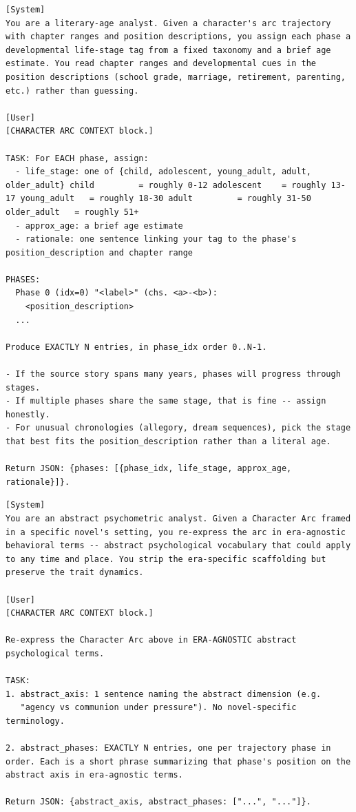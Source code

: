 \documentclass{llmxive}
\begin{document}
\begin{table}[htbp]
\centering
\begin{lstlisting}[basicstyle=\ttfamily\scriptsize]
[System]
You are a literary-age analyst. Given a character's arc trajectory with chapter ranges and position descriptions, you assign each phase a developmental life-stage tag from a fixed taxonomy and a brief age estimate. You read chapter ranges and developmental cues in the position descriptions (school grade, marriage, retirement, parenting, etc.) rather than guessing.

[User]
[CHARACTER ARC CONTEXT block.]

TASK: For EACH phase, assign:
  - life_stage: one of {child, adolescent, young_adult, adult, older_adult} child         = roughly 0-12 adolescent    = roughly 13-17 young_adult   = roughly 18-30 adult         = roughly 31-50 older_adult   = roughly 51+
  - approx_age: a brief age estimate
  - rationale: one sentence linking your tag to the phase's position_description and chapter range

PHASES:
  Phase 0 (idx=0) "<label>" (chs. <a>-<b>):
    <position_description>
  ...

Produce EXACTLY N entries, in phase_idx order 0..N-1.

- If the source story spans many years, phases will progress through stages.
- If multiple phases share the same stage, that is fine -- assign honestly.
- For unusual chronologies (allegory, dream sequences), pick the stage that best fits the position_description rather than a literal age.

Return JSON: {phases: [{phase_idx, life_stage, approx_age, rationale}]}.
\end{lstlisting}
\caption{Life-stage tagger.}
\label{tab:prompt-life-stage}
\end{table}

\begin{table}[htbp]
\centering
\begin{lstlisting}[basicstyle=\ttfamily\scriptsize]
[System]
You are an abstract psychometric analyst. Given a Character Arc framed in a specific novel's setting, you re-express the arc in era-agnostic behavioral terms -- abstract psychological vocabulary that could apply to any time and place. You strip the era-specific scaffolding but preserve the trait dynamics.

[User]
[CHARACTER ARC CONTEXT block.]

Re-express the Character Arc above in ERA-AGNOSTIC abstract psychological terms.

TASK:
1. abstract_axis: 1 sentence naming the abstract dimension (e.g.
   "agency vs communion under pressure"). No novel-specific terminology.

2. abstract_phases: EXACTLY N entries, one per trajectory phase in order. Each is a short phrase summarizing that phase's position on the abstract axis in era-agnostic terms.

Return JSON: {abstract_axis, abstract_phases: ["...", "..."]}.
\end{lstlisting}
\caption{Era-agnostic axis re-expression (Out-of-World only).}
\label{tab:prompt-axis-re-exp}
\end{table}
\end{document}
